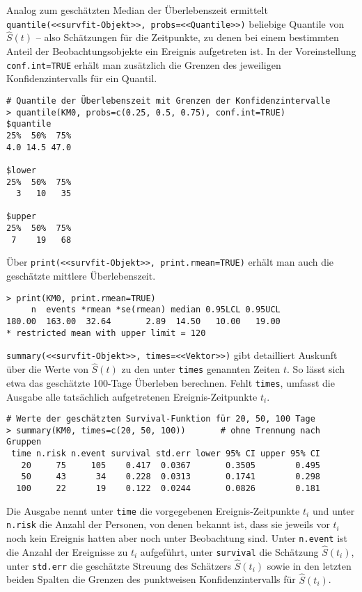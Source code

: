 Analog zum geschätzten Median der Überlebenszeit ermittelt \lstinline!quantile(<<survfit-Objekt>>, probs=<<Quantile>>)! beliebige Quantile von $\hat{S}(t)$ -- also Schätzungen für die Zeitpunkte, zu denen bei einem bestimmten Anteil der Beobachtungsobjekte ein Ereignis aufgetreten ist. In der Voreinstellung \lstinline!conf.int=TRUE! erhält man zusätzlich die Grenzen des jeweiligen Konfidenzintervalls für ein Quantil.
\begin{lstlisting}
# Quantile der Überlebenszeit mit Grenzen der Konfidenzintervalle
> quantile(KM0, probs=c(0.25, 0.5, 0.75), conf.int=TRUE)
$quantile
25%  50%  75%
4.0 14.5 47.0

$lower
25%  50%  75%
  3   10   35

$upper
25%  50%  75%
 7    19   68
\end{lstlisting}

Über \lstinline!print(<<survfit-Objekt>>, print.rmean=TRUE)! erhält man auch die geschätzte mittlere Überlebenszeit.
\begin{lstlisting}
> print(KM0, print.rmean=TRUE)
     n  events *rmean *se(rmean) median 0.95LCL 0.95UCL
180.00  163.00  32.64       2.89  14.50   10.00   19.00
* restricted mean with upper limit = 120
\end{lstlisting}

\lstinline!summary(<<survfit-Objekt>>, times=<<Vektor>>)! gibt detailliert Auskunft über die Werte von $\hat{S}(t)$ zu den unter \lstinline!times! genannten Zeiten $t$. So lässt sich etwa das geschätzte 100-Tage Überleben berechnen. Fehlt \lstinline!times!, umfasst die Ausgabe alle tatsächlich aufgetretenen Ereignis-Zeitpunkte $t_{i}$.
\begin{lstlisting}
# Werte der geschätzten Survival-Funktion für 20, 50, 100 Tage
> summary(KM0, times=c(20, 50, 100))       # ohne Trennung nach Gruppen
 time n.risk n.event survival std.err lower 95% CI upper 95% CI
   20     75     105    0.417  0.0367       0.3505        0.495
   50     43      34    0.228  0.0313       0.1741        0.298
  100     22      19    0.122  0.0244       0.0826        0.181
\end{lstlisting}

Die Ausgabe nennt unter \lstinline!time! die vorgegebenen Ereignis-Zeitpunkte $t_{i}$ und unter \lstinline!n.risk! die Anzahl der Personen, von denen bekannt ist, dass sie jeweils vor $t_{i}$ noch kein Ereignis hatten aber noch unter Beobachtung sind. Unter \lstinline!n.event! ist die Anzahl der Ereignisse zu $t_{i}$ aufgeführt, unter \lstinline!survival! die Schätzung $\hat{S}(t_{i})$, unter \lstinline!std.err! die geschätzte Streuung des Schätzers $\hat{S}(t_{i})$ sowie in den letzten beiden Spalten die Grenzen des punktweisen Konfidenzintervalls für $\hat{S}(t_{i})$.

